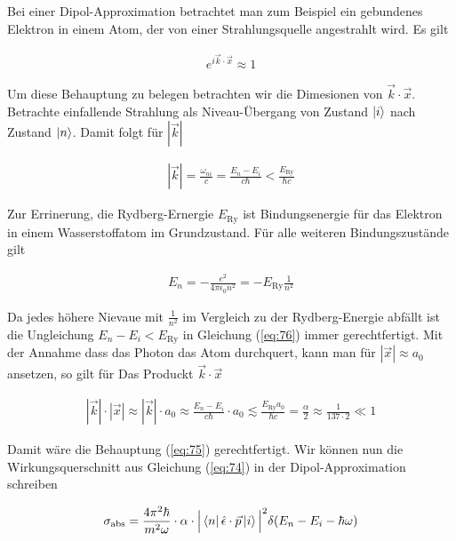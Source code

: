 Bei einer Dipol-Approximation betrachtet man zum Beispiel ein gebundenes Elektron in einem Atom, der von einer Strahlungsquelle angestrahlt wird. Es gilt

\begin{align}
  \label{eq:75}
   e^{i\vec k\cdot \vec x} \approx 1
\end{align}

Um diese Behauptung zu belegen betrachten wir die Dimesionen von \(\vec k\cdot \vec x\). Betrachte einfallende Strahlung als Niveau-Übergang von Zustand \(\left| i \right\rangle\) nach Zustand \(\left| n \right\rangle\). Damit folgt für \(|\vec k|\)

\begin{align}
  \label{eq:76}
  |\vec k| = \frac{\omega_{ni}}{c} = \frac{E_n - E_i}{c \hbar} < \frac{E_{\text{Ry}}}{\hbar c}
\end{align}

Zur Errinerung, die Rydberg-Ernergie \(E_{\text{Ry}}\) ist Bindungsenergie für das Elektron in einem Wasserstoffatom im Grundzustand. Für alle weiteren Bindungszustände gilt

\begin{align}
  \label{eq:77}
  E_n = -\frac{e^2}{4\pi \epsilon_0 n^2} =  -E_{\text{Ry}}\frac{1}{n^2}
\end{align}

Da jedes höhere Nievaue mit \(\frac{1}{n^2}\) im Vergleich zu der Rydberg-Energie abfällt ist die Ungleichung \(E_n - E_i < E_{\text{Ry}}\) in Gleichung (\ref{eq:76}) immer gerechtfertigt. Mit der Annahme dass das Photon das Atom durchquert, kann man für \(|\vec x|\approx a_0\) ansetzen, so gilt für Das Produckt \(\vec k\cdot \vec x\)

\begin{align}
  \label{eq:78}
  |\vec k|\cdot |\vec x| \approx |\vec k|\cdot a_0 \approx \frac{E_n - E_i}{c \hbar} \cdot a_0 \lesssim \frac{E_{\text{Ry}} a_0}{\hbar c} = \frac{\alpha}{2} \approx \frac{1}{137\cdot 2} \ll 1
\end{align}

Damit wäre die Behauptung (\ref{eq:75}) gerechtfertigt. Wir können nun die Wirkungsquerschnitt aus Gleichung (\ref{eq:74}) in der Dipol-Approximation schreiben

\begin{align}
  \label{eq:79}
  \sigma_{\text{abs}} = \frac{4 \pi^2 \hbar }{ m^2 \omega} \cdot \alpha \cdot \Big| \left\langle n \right| \hat\epsilon \cdot \vec p \left| i \right\rangle \Big|^2 \delta(E_n - E_i - \hbar\omega)
\end{align}


